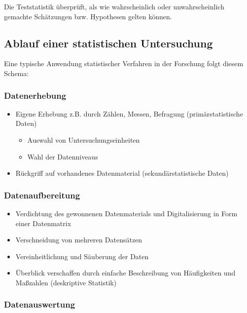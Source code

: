 \documentclass[
  11pt,
  ngerman,
  a4paper,
]{report}
\providecommand{\tightlist}{%
  \setlength{\itemsep}{0pt}\setlength{\parskip}{0pt}}
\begin{document}
Die Teststatistik überprüft, als wie wahrscheinlich oder unwahrscheinlich gemachte Schätzungen bzw. Hypothesen gelten können.

\hypertarget{ablauf-einer-statistischen-untersuchung}{%
\subsection{Ablauf einer statistischen Untersuchung}\label{ablauf-einer-statistischen-untersuchung}}

Eine typische Anwendung statistischer Verfahren in der Forschung folgt diesem Schema:

\hypertarget{datenerhebung}{%
\subsubsection{Datenerhebung}\label{datenerhebung}}

\begin{itemize}
\tightlist
\item
  Eigene Erhebung z.B. durch Zählen, Messen, Befragung (primärstatistische Daten)

  \begin{itemize}
  \tightlist
  \item
    Auswahl von Untersuchungseinheiten
  \item
    Wahl der Datenniveaus
  \end{itemize}
\item
  Rückgriff auf vorhandenes Datenmaterial (sekundärstatistische Daten)
\end{itemize}

\hypertarget{datenaufbereitung}{%
\subsubsection{Datenaufbereitung}\label{datenaufbereitung}}

\begin{itemize}
\tightlist
\item
  Verdichtung des gewonnenen Datenmaterials und Digitalisierung in Form einer Datenmatrix
\item
  Verschneidung von mehreren Datensätzen
\item
  Vereinheitlichung und Säuberung der Daten
\item
  Überblick verschaffen durch einfache Beschreibung von Häufigkeiten und Maßzahlen (deskriptive Statistik)
\end{itemize}

\hypertarget{datenauswertung}{%
\subsubsection{Datenauswertung}\label{datenauswertung}}
\end{document}
